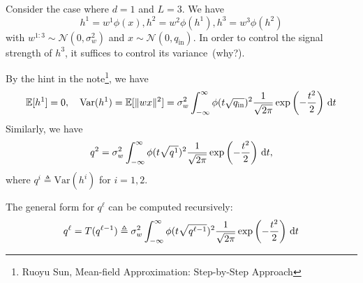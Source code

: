 \begin{example}
Consider the case where $d=1$ and $L=3$. We have
\[
h^1=w^1\phi(x),
h^2=w^2\phi(h^1),
h^3=w^3\phi(h^2)
\]
with $w^{1:3}\sim\mathcal{N}(0,\sigma_w^2)$ and $x\sim\mathcal{N}(0,q_{\text{in}})$. In order to control the signal strength of $h^3$, it suffices to control its variance~(why?).

By the hint in the note\footnote{Ruoyu Sun, Mean-field Approximation: Step-by-Step Approach}, we have
\[
\mathbb{E}[h^1]=0,\quad
\text{Var}(h^1) =\mathbb{E}[\|wx\|^2] =\sigma_w^2\int_{-\infty}^{\infty}\phi(t\sqrt{q_{\text{in}}})^2
\frac{1}{\sqrt{2\pi}}\exp\left(-\frac{t^2}{2}\right)\,\mathrm{d} t
\]
Similarly, we have
\[
q^2 = \sigma_w^2\int_{-\infty}^{\infty}\phi(t\sqrt{q^1})^2\frac{1}{\sqrt{2\pi}}\exp\left(-\frac{t^2}{2}\right)\,\mathrm{d} t,
\]
where $q^i \triangleq \text{Var}(h^i)$ for $i=1,2$.

The general form for $q^{\ell}$ can be computed recursively:
\[
q^{\ell}=T(q^{\ell-1})\triangleq
\sigma_w^2\int_{-\infty}^{\infty}\phi(t\sqrt{q^{\ell-1}})^2\frac{1}{\sqrt{2\pi}}\exp\left(-\frac{t^2}{2}\right)\,\mathrm{d} t
\]
\end{example}

